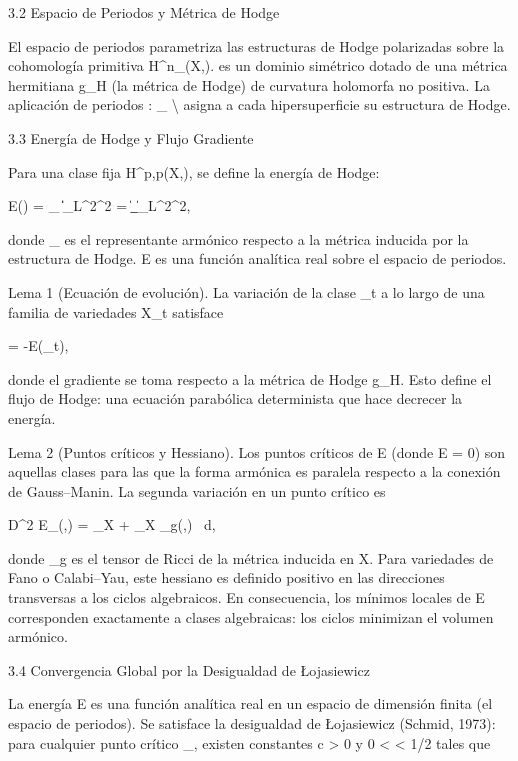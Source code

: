 \documentclass[12pt,twoside]{book}
\begin{document}
3.2 Espacio de Periodos y Métrica de Hodge

El espacio de periodos  parametriza las estructuras de Hodge polarizadas sobre la cohomología primitiva H^n_{}(X,).  es un dominio simétrico dotado de una métrica hermitiana g_H (la métrica de Hodge) de curvatura holomorfa no positiva. La aplicación de periodos \Phi: _{} \to \Gamma \backslash {} asigna a cada hipersuperficie su estructura de Hodge.

3.3 Energía de Hodge y Flujo Gradiente

Para una clase fija \alpha \in H^{p,p}(X,), se define la energía de Hodge:

E(\alpha) = \inf_{\omega \in \alpha} \|\omega\|_{L^2}^2 = \|\omega_{}\|_{L^2}^2,

donde \omega_{} es el representante armónico respecto a la métrica inducida por la estructura de Hodge. E es una función analítica real sobre el espacio de periodos.

Lema 1 (Ecuación de evolución). La variación de la clase \alpha_t a lo largo de una familia de variedades X_t satisface

 = -\nabla E(\alpha_t),

donde el gradiente se toma respecto a la métrica de Hodge g_H. Esto define el flujo de Hodge: una ecuación parabólica determinista que hace decrecer la energía.

Lema 2 (Puntos críticos y Hessiano). Los puntos críticos de E (donde \nabla E = 0) son aquellas clases para las que la forma armónica es paralela respecto a la conexión de Gauss–Manin. La segunda variación en un punto crítico es

D^2 E_\alpha(\beta,\beta) = \int_X \nabla \beta \wedge * \nabla \beta + \int_X _g(\beta,\beta) \, d,

donde _g es el tensor de Ricci de la métrica inducida en X. Para variedades de Fano o Calabi–Yau, este hessiano es definido positivo en las direcciones transversas a los ciclos algebraicos. En consecuencia, los mínimos locales de E corresponden exactamente a clases algebraicas: los ciclos minimizan el volumen armónico.

3.4 Convergencia Global por la Desigualdad de Łojasiewicz

La energía E es una función analítica real en un espacio de dimensión finita (el espacio de periodos). Se satisface la desigualdad de Łojasiewicz (Schmid, 1973): para cualquier punto crítico \alpha_\infty, existen constantes c > 0 y 0 < \theta < 1/2 tales que
\end{document}
